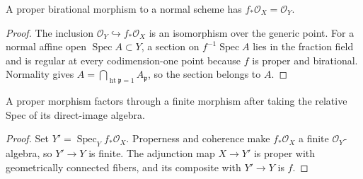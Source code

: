 \begin{corollary}\label{ha-ch3-cor-zariski-main}
A proper birational morphism to a normal scheme has
$f_*\mathcal O_X=\mathcal O_Y$.

\end{corollary}
\begin{proof}

The inclusion $\mathcal O_Y\hookrightarrow f_*\mathcal O_X$ is an isomorphism over the generic point.
For a normal affine open $\operatorname{Spec}A\subset Y$, a section on $f^{-1}\operatorname{Spec}A$
lies in the fraction field and is regular at every codimension-one point because $f$ is proper and
birational.  Normality gives $A=\bigcap_{\operatorname{ht}\mathfrak p=1}A_{\mathfrak p}$, so the
section belongs to $A$.

\end{proof}
\begin{corollary}\label{ha-ch3-cor-stein}
A proper morphism factors through a finite morphism after taking the relative
Spec of its direct-image algebra.

\end{corollary}
\begin{proof}

Set $Y'=\operatorname{Spec}_Yf_*\mathcal O_X$.  Properness and coherence make $f_*\mathcal O_X$
 a finite $\mathcal O_Y$-algebra, so $Y'\to Y$ is finite.  The adjunction map $X\to Y'$ is proper
 with geometrically connected fibers, and its composite with $Y'\to Y$ is $f$.

\end{proof}

